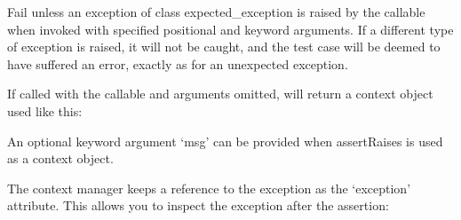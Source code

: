 \documentclass[letterpaper,10pt,english]{sphinxmanual}
\begin{document}
\begin{fulllineitems}
\begin{fulllineitems}
\end{fulllineitems}


\begin{fulllineitems}
\label{\detokenize{_autosummary/tests.test_unit.test_df:tests.test_unit.test_df.assertRaises}}
\pysigstartsignatures
{}
\pysigstopsignatures
\sphinxAtStartPar
Fail unless an exception of class expected\_exception is raised
by the callable when invoked with specified positional and
keyword arguments. If a different type of exception is
raised, it will not be caught, and the test case will be
deemed to have suffered an error, exactly as for an
unexpected exception.

\sphinxAtStartPar
If called with the callable and arguments omitted, will return a
context object used like this:

\begin{sphinxVerbatim}[commandchars=\\\{\}]
 
\end{sphinxVerbatim}

\sphinxAtStartPar
An optional keyword argument ‘msg’ can be provided when assertRaises
is used as a context object.

\sphinxAtStartPar
The context manager keeps a reference to the exception as
the ‘exception’ attribute. This allows you to inspect the
exception after the assertion:

\begin{sphinxVerbatim}[commandchars=\\\{\}]
   
  
 
\end{sphinxVerbatim}


\end{fulllineitems}
\end{fulllineitems}
\end{document}
